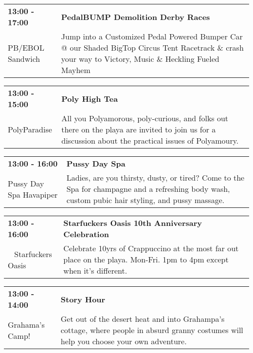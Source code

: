 \begin{tabular}{ p{1in} p{2.2in} }
    \textbf{13:00 - 17:00} & \textbf{PedalBUMP Demolition Derby Races} \\
    PB/EBOL Sandwich \newline  & Jump into a Customized Pedal Powered Bumper Car @ our Shaded BigTop Circus Tent Racetrack \& crash your way to Victory, Music \& Heckling Fueled Mayhem \\
    \hline 
\end{tabular}
    
\begin{tabular}{ p{1in} p{2.2in} }
    \textbf{13:00 - 15:00} & \textbf{Poly High Tea} \\
    PolyParadise \newline  & All you Polyamorous, poly-curious, and folks out there on the playa are invited to join us for a discussion about the practical issues of Polyamoury. \\
    \hline 
\end{tabular}
    
\begin{tabular}{ p{1in} p{2.2in} }
    \textbf{13:00 - 16:00} & \textbf{Pussy Day Spa} \\
    Pussy Day Spa \newline Havapiper & Ladies, are you thirsty, dusty, or tired? Come to the Spa for champagne and a refreshing body wash, custom pubic hair styling, and pussy massage. \\
    \hline 
\end{tabular}
    
\begin{tabular}{ p{1in} p{2.2in} }
    \textbf{13:00 - 16:00} & \textbf{Starfuckers Oasis 10th Anniversary Celebration} \\
    ~ \newline Starfuckers Oasis & Celebrate 10yrs of Crappuccino at the most far out place on the playa. Mon-Fri. 1pm to 4pm except when it's different. \\
    \hline 
\end{tabular}
    
\begin{tabular}{ p{1in} p{2.2in} }
    \textbf{13:00 - 14:00} & \textbf{Story Hour} \\
    Grahama's Camp! \newline  & Get out of the desert heat and into Grahampa's cottage, where people in absurd granny costumes will help you choose your own adventure. \\
    \hline 
\end{tabular}
    
